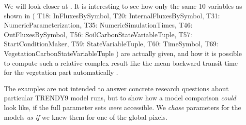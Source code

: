 We will look closer at  
  . It is interesting to see how only the same 10 variables 
  as shown in  
      (
          T18: InFluxesBySymbol, 
        	T20: InternalFluxesBySymbol, 
        	T31: NumericParameterization, 
        	T35: NumericSimulationTimes, 
        	T46: OutFluxesBySymbol, 
        	T56: SoilCarbonStateVariableTuple, 
        	T57: StartConditionMaker, 
        	T59: StateVariableTuple, 
        	T60: TimeSymbol, 
        	T69: VegetationCarbonStateVariableTuple
      )
  are actually given,
  and how it is possible to compute such a relative complex result
  like the mean backward transit time for the vegetation part automatically
  .

The examples are not intended to answer concrete research questions about particular TRENDY9 model runs, but to show how a model comparison \emph{could} look like, if the full parameter sets \emph{were} accessible. 
We \emph{chose}  parameters for the models 
\emph{as if} we knew them for one of the global pixels.  

